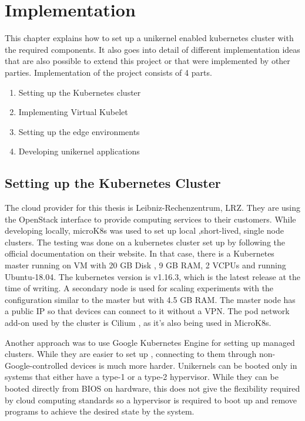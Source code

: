 \chapter{Implementation}\label{chapter:implementation}
This chapter explains how to set up a unikernel enabled kubernetes cluster with the required components. It also goes into detail of different implementation ideas that are also possible to extend this project or that were implemented by other parties. Implementation of the project consists of 4 parts.
\begin{enumerate}
\item Setting up the Kubernetes cluster
\item Implementing Virtual Kubelet
\item Setting up the edge environments
\item Developing unikernel applications
\end{enumerate}
\section{Setting up the Kubernetes Cluster}
The cloud provider for this thesis is Leibniz-Rechenzentrum, LRZ. They are using the OpenStack \cite{openstack} interface to provide computing services to their customers. While developing locally, microK8s was used to set up local ,short-lived, single node clusters. The testing was done on a kubernetes cluster set up by following the official documentation on their website. In that case, there is a Kubernetes master running on VM with 20 GB Disk , 9 GB RAM, 2 VCPUs and running Ubuntu-18.04. The kubernetes version is v1.16.3, which is the latest release at the time of writing. A secondary node is used for scaling experiments with the configuration similar to the master but with 4.5 GB RAM. The master node has a public IP so that devices can connect to it without a VPN. The pod network add-on used by the cluster is Cilium \cite{cilium}, as it's also being used in MicroK8s.

Another approach was to use Google Kubernetes Engine for setting up managed clusters. While they are easier to set up , connecting to them through non-Google-controlled devices is much more harder. 
\iffalse
Unikernels can be booted only in systems that either have a type-1 or a type-2 hypervisor. While they can be booted directly from BIOS on hardware, this does not give the flexibility required by cloud computing standards so a hypervisor is required to boot up and remove programs to achieve the desired state by the system.

